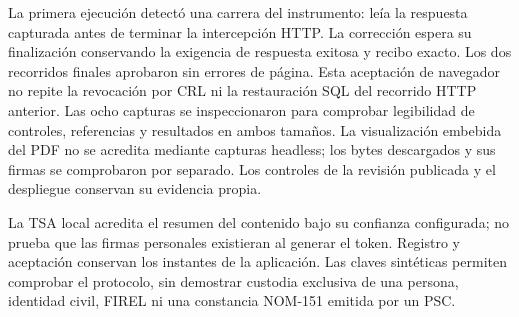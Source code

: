 La primera ejecución detectó una carrera del instrumento: leía la respuesta
capturada antes de terminar la intercepción HTTP. La corrección espera su
finalización conservando la exigencia de respuesta exitosa y recibo exacto.
Los dos recorridos finales aprobaron sin errores de página. Esta aceptación
de navegador no repite la revocación por CRL ni la restauración SQL del
recorrido HTTP anterior. Las ocho capturas se inspeccionaron para comprobar
legibilidad de controles, referencias y resultados en ambos tamaños. La
visualización embebida del PDF no se acredita mediante capturas headless;
los bytes descargados y sus firmas se comprobaron por separado. Los controles
de la revisión publicada y el despliegue conservan su evidencia propia.

La TSA local acredita el resumen del contenido bajo su confianza configurada;
no prueba que las firmas personales existieran al generar el token. Registro
y aceptación conservan los instantes de la aplicación. Las claves sintéticas
permiten comprobar el protocolo, sin demostrar custodia exclusiva de una
persona, identidad civil, FIREL ni una constancia NOM-151 emitida por un PSC.
